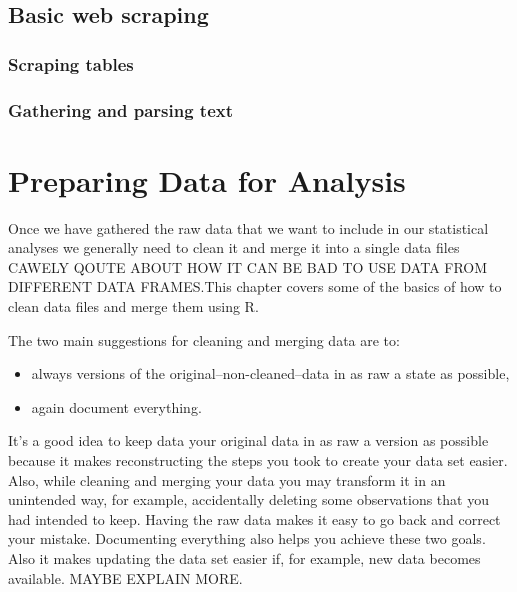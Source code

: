 \documentclass[ChapterTOCs,krantz1]{krantz}\usepackage{graphicx, color}
\begin{document}
\section{Basic web scraping}

\subsection{Scraping tables}

\subsection{Gathering and parsing text}





\chapter{Preparing Data for Analysis}

Once we have gathered the raw data that we want to include in our statistical analyses we generally need to clean it and merge it into a single data files CAWELY QOUTE ABOUT HOW IT CAN BE BAD TO USE DATA FROM DIFFERENT DATA FRAMES.This chapter covers some of the basics of how to clean data files and merge them using R. 

The two main suggestions for cleaning and merging data are to:

\begin{itemize}
    \item always versions of the original--non-cleaned--data in as raw a state as possible,
    \item again document everything.
\end{itemize}

It's a good idea to keep data your original data in as raw a version as possible because it makes reconstructing the steps you took to create your data set easier. Also, while cleaning and merging your data you may transform it in an unintended way, for example, accidentally deleting some observations that you had intended to keep. Having the raw data makes it easy to go back and correct your mistake. Documenting everything also helps you achieve these two goals. Also it makes updating the data set easier if, for example, new data becomes available. MAYBE EXPLAIN MORE.
\end{document}
